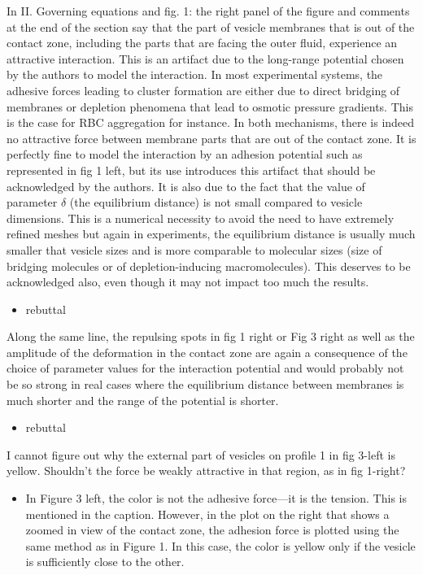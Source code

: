 \documentclass[11pt]{article}
\newcommand{\comment}[1]{{\color{blue} #1}}
\begin{document}
\noindent
\comment{In II. Governing equations and fig. 1: the right panel of the
figure and comments at the end of the section say that the part of
vesicle membranes that is out of the contact zone, including the parts
that are facing the outer fluid, experience an attractive interaction.
This is an artifact due to the long-range potential chosen by the
authors to model the interaction. In most experimental systems, the
adhesive forces leading to cluster formation are either due to direct
bridging of membranes or depletion phenomena that lead to osmotic
pressure gradients. This is the case for RBC aggregation for instance.
In both mechanisms, there is indeed no attractive force between membrane
parts that are out of the contact zone. It is perfectly fine to model
the interaction by an adhesion potential such as represented in fig 1
left, but its use introduces this artifact that should be acknowledged
by the authors. It is also due to the fact that the value of parameter
$\delta$ (the equilibrium distance) is not small compared to vesicle
dimensions. This is a numerical necessity to avoid the need to have
extremely refined meshes but again in experiments, the equilibrium
distance is usually much smaller that vesicle sizes and is more
comparable to molecular sizes (size of bridging molecules or of
depletion-inducing macromolecules). This deserves to be acknowledged
also, even though it may not impact too much the results.}
\begin{itemize}
  \item rebuttal
\end{itemize}

\noindent
\comment{Along the same line, the repulsing spots in fig 1 right or Fig 3
right as well as the amplitude of the deformation in the contact zone
are again a consequence of the choice of parameter values for the
interaction potential and would probably not be so strong in real
cases where the equilibrium distance between membranes is much shorter
and the range of the potential is shorter.}
\begin{itemize}
  \item rebuttal
\end{itemize}

\noindent
\comment{I cannot figure out why the external part of vesicles on profile 1
in fig 3-left is yellow. Shouldn't the force be weakly attractive in
that region, as in fig 1-right?}
\begin{itemize}
  \item In Figure 3 left, the color is not the adhesive force---it is the
    tension.  This is mentioned in the caption.  However, in the plot on
    the right that shows a zoomed in view of the contact zone, the
    adhesion force is plotted using the same method as in Figure 1.  In
    this case, the color is yellow only if the vesicle is sufficiently
    close to the other.
\end{itemize}
\end{document}
